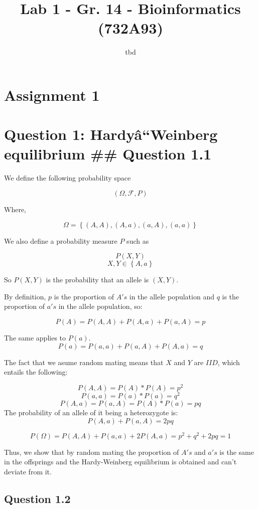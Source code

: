 \documentclass[]{article}
\title{Lab 1 - Gr. 14 - Bioinformatics (732A93)}
\author{tbd}
\date{}
\begin{document}
\maketitle

\section{Assignment 1}\label{assignment-1}

\section{Question 1: Hardyâ``Weinberg equilibrium \#\# Question
1.1}\label{question-1-hardyaweinberg-equilibrium-question-1.1}

We define the following probability space

\[\left(\Omega,\mathcal{F},P\right)\]

Where,

\[\Omega = \left\{(A,A), (A,a), (a,A), (a,a)\right\}\]

We also define a probability measure \(P\) such as

\[P(X, Y)\] \[X,Y \in \left\{A, a\right\}\]

So \(P(X,Y)\) is the probability that an allele is \((X,Y)\).

By definition, \(p\) is the proportion of \(A's\) in the allele
population and \(q\) is the proportion of \(a's\) in the allele
population, so:

\[P(A) = P(A,A) + P(A,a) + P(a,A) = p\]

The same applies to \(P(a)\). \[P(a) = P(a,a) + P(a,A) + P(A,a)= q\]

The fact that we asume random mating means that \(X\) and \(Y\) are
\(IID\), which entails the following:

\[P(A,A) = P(A) * P(A) = p^{2}\] \[P(a,a) = P(a) * P(a) = q^{2}\]
\[P(A,a) = P(a,A) = P(A)*P(a) = pq\] The probability of an allele of it
being a heterozygote is: \[P(A,a) + P(a,A) = 2pq\]

\[P(\Omega) = P(A,A) + P(a,a) + 2P(A,a) = p^{2} + q^{2} + 2pq = 1\]

Thus, we show that by random mating the proportion of \(A's\) and
\(a's\) is the same in the offsprings and the Hardy-Weinberg equilibrium
is obtained and can't deviate from it.

\subsection{Question 1.2}\label{question-1.2}
\end{document}
